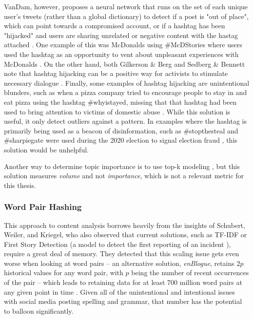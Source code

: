 \documentclass[preprint,review,12pt]{elsarticle}
\begin{document}
VanDam, however, proposes a neural network that runs on the set of each unique user's tweets (rather than a global dictionary) to detect if a post is "out of place", which can point towards a compromised account, or if a hashtag has been "hijacked" and users are sharing unrelated or negative content with the hastag attached  \cite{vandam2019learning, vandam2016detecting}. One example of this was McDonalds using \#McDStories where users used the hashtag as an opportunity to vent about unpleasant experiences with McDonalds \cite{jain2015hashjacker}. On the other hand, both Gilkerson & Berg and Sedberg & Bennett note that hashtag hijacking can be a positive way for activists to stimulate necessary dialogue \cite{gilkerson2018social,bennett2012logic}. Finally, some examples of hashtag hijacking are unintentional blunders, such as when a pizza company tried to encourage people to stay in and eat pizza using the hashtag \#whyistayed, missing that that hashtag had been used to bring attention to victims of domestic abuse \cite{vandam2019learning}. While this solution is useful, it only detect outliers against a pattern. In examples where the hashtag is primarily being used as a beacon of disinformation, such as \#stopthesteal and \#sharpiegate were used during the 2020 election to signal election fraud \cite{perez2020facebook}, this solution would be unhelpful.

Another way to determine topic importance is to use top-k modeling \cite{babcock2003distributed}, but this solution measures \textit{volume} and not \textit{importance}, which is not a relevant metric for this thesis. 

\subsubsection{Word Pair Hashing}
This approach to content analysis borrows heavily from the insights of Schubert, Weiler, and Kriegel, who also observed that current solutions, such as TF-IDF or First Story Detection (a model to detect the first reporting of an incident \cite{petrovic2010streaming,yang1998study}), require a great deal of memory. They detected that this scaling issue gets even worse when looking at word pairs -- an alternative solution, \textit{enBlogue}, retains $2p$ historical values for any word pair, with $p$ being the number of recent occurrences of the pair \cite{alvanaki2012see} -- which leads to retaining data for at least 700 million word pairs at any given point in time \cite{schubert2014signitrend}. Given all of the unintentional and intentional issues with social media posting spelling and grammar, that number has the potential to balloon significantly. 
\end{document}
